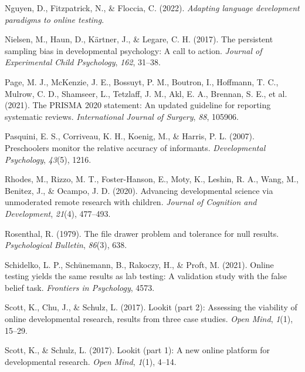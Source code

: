 \documentclass[
  man,floatsintext]{apa6}
\newlength{\cslhangindent}
\newlength{\cslentryspacingunit} %
\newenvironment{CSLReferences}[2] %
 {%
  \setlength{\parindent}{0pt}
  \ifodd #1
  \let\oldpar\par
  \def\par{\hangindent=\cslhangindent\oldpar}
  \fi
  \setlength{\parskip}{#2\cslentryspacingunit}
 }%
 {}
\begin{document}
\begin{CSLReferences}{1}{0}
\leavevmode{}%
Nguyen, D., Fitzpatrick, N., \& Floccia, C. (2022). \emph{Adapting language development paradigms to online testing}.

\leavevmode{}%
Nielsen, M., Haun, D., Kärtner, J., \& Legare, C. H. (2017). The persistent sampling bias in developmental psychology: A call to action. \emph{Journal of Experimental Child Psychology}, \emph{162}, 31--38.

\leavevmode{}%
Page, M. J., McKenzie, J. E., Bossuyt, P. M., Boutron, I., Hoffmann, T. C., Mulrow, C. D., Shamseer, L., Tetzlaff, J. M., Akl, E. A., Brennan, S. E., et al. (2021). The PRISMA 2020 statement: An updated guideline for reporting systematic reviews. \emph{International Journal of Surgery}, \emph{88}, 105906.

\leavevmode{}%
Pasquini, E. S., Corriveau, K. H., Koenig, M., \& Harris, P. L. (2007). Preschoolers monitor the relative accuracy of informants. \emph{Developmental Psychology}, \emph{43}(5), 1216.

\leavevmode{}%
Rhodes, M., Rizzo, M. T., Foster-Hanson, E., Moty, K., Leshin, R. A., Wang, M., Benitez, J., \& Ocampo, J. D. (2020). Advancing developmental science via unmoderated remote research with children. \emph{Journal of Cognition and Development}, \emph{21}(4), 477--493.

\leavevmode{}%
Rosenthal, R. (1979). The file drawer problem and tolerance for null results. \emph{Psychological Bulletin}, \emph{86}(3), 638.

\leavevmode{}%
Schidelko, L. P., Schünemann, B., Rakoczy, H., \& Proft, M. (2021). Online testing yields the same results as lab testing: A validation study with the false belief task. \emph{Frontiers in Psychology}, 4573.

\leavevmode{}%
Scott, K., Chu, J., \& Schulz, L. (2017). Lookit (part 2): Assessing the viability of online developmental research, results from three case studies. \emph{Open Mind}, \emph{1}(1), 15--29.

\leavevmode{}%
Scott, K., \& Schulz, L. (2017). Lookit (part 1): A new online platform for developmental research. \emph{Open Mind}, \emph{1}(1), 4--14.


\end{CSLReferences}
\end{document}
